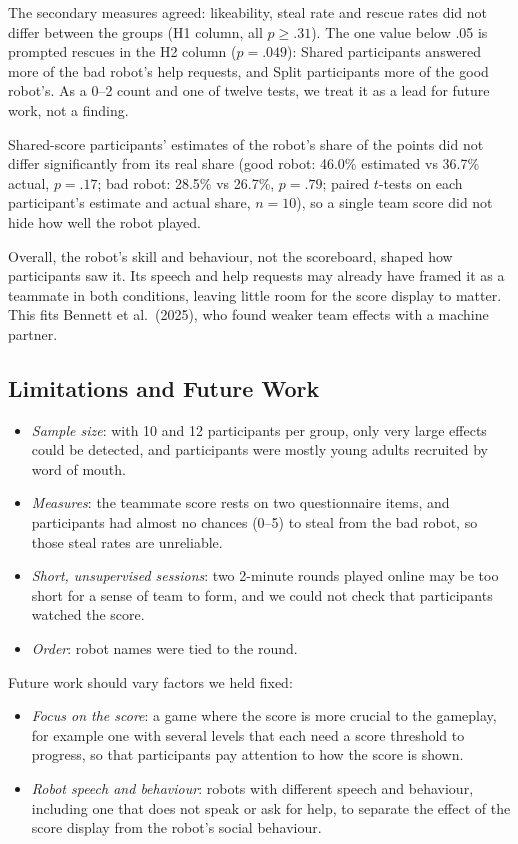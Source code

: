 The secondary measures agreed: likeability, steal rate and rescue rates did not differ between the groups (H1 column, all $p\geq.31$). The one value below .05 is prompted rescues in the H2 column ($p=.049$): Shared participants answered more of the bad robot's help requests, and Split participants more of the good robot's. As a 0--2 count and one of twelve tests, we treat it as a lead for future work, not a finding.

Shared-score participants' estimates of the robot's share of the points did not differ significantly from its real share (good robot: 46.0\% estimated vs 36.7\% actual, $p=.17$; bad robot: 28.5\% vs 26.7\%, $p=.79$; paired $t$-tests on each participant's estimate and actual share, $n=10$), so a single team score did not hide how well the robot played.

Overall, the robot's skill and behaviour, not the scoreboard, shaped how participants saw it. Its speech and help requests may already have framed it as a teammate in both conditions, leaving little room for the score display to matter. This fits Bennett et al.\ (2025), who found weaker team effects with a machine partner.

\subsection{Limitations and Future Work}
\begin{itemize}[nosep]
    \item \textit{Sample size}: with 10 and 12 participants per group, only very large effects could be detected, and participants were mostly young adults recruited by word of mouth.
    \item \textit{Measures}: the teammate score rests on two questionnaire items, and participants had almost no chances (0--5) to steal from the bad robot, so those steal rates are unreliable.
    \item \textit{Short, unsupervised sessions}: two 2-minute rounds played online may be too short for a sense of team to form, and we could not check that participants watched the score.
    \item \textit{Order}: robot names were tied to the round.
\end{itemize}
Future work should vary factors we held fixed:
\begin{itemize}[nosep]
    \item \textit{Focus on the score}: a game where the score is more crucial to the gameplay, for example one with several levels that each need a score threshold to progress, so that participants pay attention to how the score is shown.
    \item \textit{Robot speech and behaviour}: robots with different speech and behaviour, including one that does not speak or ask for help, to separate the effect of the score display from the robot's social behaviour.
\end{itemize}

